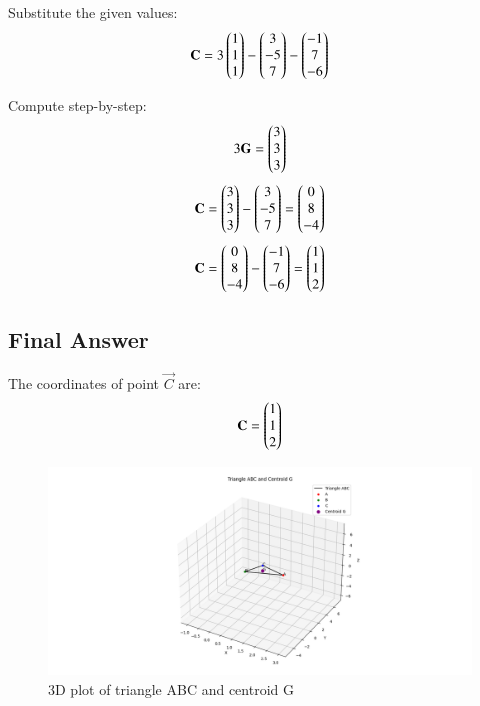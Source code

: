 \documentclass[journal]{IEEEtran}
\begin{document}
Substitute the given values:
\[
\vec{C} = 3\myvec{1\\1\\1} - \myvec{3\\-5\\7} - \myvec{-1\\7\\-6}
\]

Compute step-by-step:
\[
3\vec{G} = \myvec{3\\3\\3}
\]
\[
\vec{C} = \myvec{3\\3\\3} - \myvec{3\\-5\\7} = \myvec{0\\8\\-4}
\]
\[
\vec{C} = \myvec{0\\8\\-4} - \myvec{-1\\7\\-6} = \myvec{1\\1\\2}
\]

\subsection*{Final Answer}

The coordinates of point $\vec{C}$ are:
\[
\vec{C} = \myvec{1\\1\\2}
\]


















\newpage
\begin{figure}[h!]
   \centering
   \includegraphics[width=1\linewidth]{figs/fig1.png}
   \caption{3D plot of triangle ABC and centroid G}
   \label{}
\end{figure}
\end{document}
